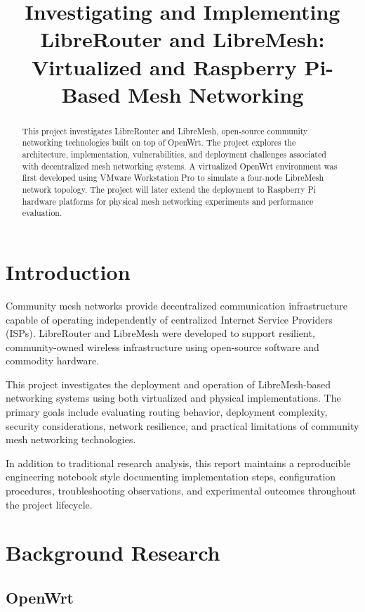 \documentclass[conference]{IEEEtran}
\title{
Investigating and Implementing LibreRouter and LibreMesh:
Virtualized and Raspberry Pi-Based Mesh Networking
}
\author{
\IEEEauthorblockN{Your Name}
\IEEEauthorblockA{
EC3730 Final Project
}
}
\begin{document}
\maketitle

\begin{abstract}

This project investigates LibreRouter and LibreMesh, open-source community networking technologies built on top of OpenWrt. The project explores the architecture, implementation, vulnerabilities, and deployment challenges associated with decentralized mesh networking systems. A virtualized OpenWrt environment was first developed using VMware Workstation Pro to simulate a four-node LibreMesh network topology. The project will later extend the deployment to Raspberry Pi hardware platforms for physical mesh networking experiments and performance evaluation.

\end{abstract}

\section{Introduction}

Community mesh networks provide decentralized communication infrastructure capable of operating independently of centralized Internet Service Providers (ISPs). LibreRouter and LibreMesh were developed to support resilient, community-owned wireless infrastructure using open-source software and commodity hardware.

This project investigates the deployment and operation of LibreMesh-based networking systems using both virtualized and physical implementations. The primary goals include evaluating routing behavior, deployment complexity, security considerations, network resilience, and practical limitations of community mesh networking technologies.

In addition to traditional research analysis, this report maintains a reproducible engineering notebook style documenting implementation steps, configuration procedures, troubleshooting observations, and experimental outcomes throughout the project lifecycle.

\section{Background Research}

\subsection{OpenWrt}
\end{document}
